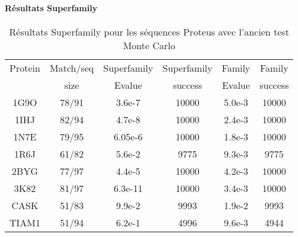     \clearpage
   \paragraph{Résultats Superfamily}



    \begin{table}[h]
           \raggedleft{}

      \begin{tabular}{cccccc}

        \toprule
        Protein & Match/seq & Superfamily & Superfamily & Family & Family \\
                & size      & Evalue      & success     & Evalue & success\\
        \cmidrule{1-6}
        1G9O  & 78/91 & 3.6e-7  &  10000 & 5.0e-3  & 10000 \\
        1IHJ  & 82/94 & 4.7e-8  &  10000 & 2.4e-3  & 10000 \\
        1N7E  & 79/95 & 6.05e-6 &  10000 & 1.8e-3  & 10000 \\
        1R6J  & 61/82 & 5.6e-2  &   9775 & 9.3e-3  &  9775 \\
        2BYG  & 77/97 & 4.4e-5  &  10000 & 4.2e-3  & 10000 \\
        3K82  & 81/97 & 6.3e-11 &  10000 & 3.4e-3  & 10000 \\
        CASK  & 51/83 & 9.9e-2  &   9993 & 1.9e-2  &  9993 \\
        TIAM1 & 51/94 & 6.2e-1  &   4996 & 9.6e-3  &  4944 \\
        \bottomrule        
      \end{tabular}   
     \caption{Résultats Superfamily pour les séquences Proteus avec l'ancien test Monte Carlo}   
\label{tab:superfamily_Old_MCtest}       
\end{table}



